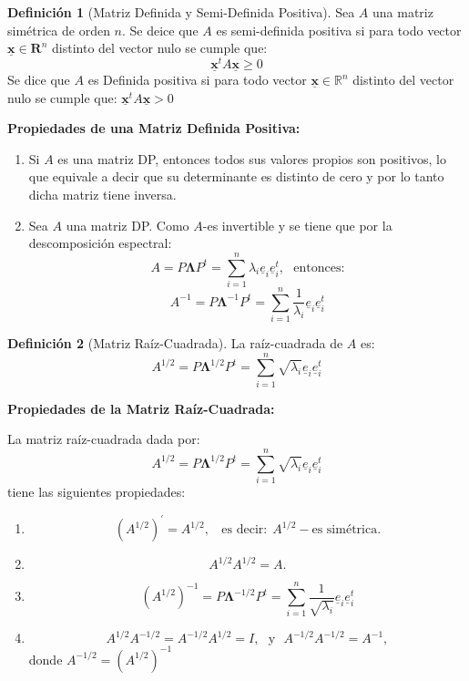 \documentclass[
]{book}
\theoremstyle{definition}
\newtheorem{definition}{Definición}[chapter]
\theoremstyle{definition}
\theoremstyle{definition}
\theoremstyle{definition}
\theoremstyle{remark}
\begin{document}
\begin{definition}[Matriz Definida y Semi-Definida Positiva]
\protect\hypertarget{def:matriz-def-pos}{}\label{def:matriz-def-pos}Sea \(A\) una matriz simétrica de orden \(n\). Se deice que \(A\) es semi-definida positiva si para todo vector \(\underline{\mathbf{x}}\in \mathbf{R}^n\) distinto del vector nulo se cumple que:
\[
                  \underline{\mathbf{x}}^t A \underline{\mathbf{x}} \geq 0
\]
Se dice que \(A\) es Definida positiva si para todo vector \(\underline{\mathbf{x}}\in \mathbb{R}^n\) distinto del vector nulo se cumple que: \(\underline{\mathbf{x}}^t A\underline{\mathbf{x}} > 0\)
\end{definition}

\textbf{Propiedades de una Matriz Definida Positiva:}

\begin{enumerate}
\def\labelenumi{\alph{enumi}.}
\item
  Si \(A\) es una matriz DP, entonces todos sus valores propios son positivos, lo que equivale a decir que su determinante es distinto de cero y por lo tanto dicha matriz tiene inversa.
\item
  Sea \(A\) una matriz DP. Como \(A\)-es invertible y se tiene que por la descomposición espectral:
  \[
                 A=P\mathbf{\Lambda} P^t=\sum_{i=1}^{n}\lambda_i\underline{e}_i\underline{e}_i^t,\ \ \ \text{entonces:}
  \]
  \[
  A^{-1}=P \mathbf{\Lambda}^{-1}P^t=\sum_{i=1}^{n}\frac{1}{\lambda_i}\underline{e}_i\underline{e}_i^t
  \]
\end{enumerate}

\begin{definition}[Matriz Raíz-Cuadrada]
\protect\hypertarget{def:matriz-raiz-cuadrada}{}\label{def:matriz-raiz-cuadrada}La raíz-cuadrada de \(A\) es:
\[
A^{1/2}=P \mathbf{\mathbf{\mathbf{\mathbf{\mathbf{\Lambda}}}}}^{1/2}P^t=\sum_{i=1}^{n}\sqrt{\lambda_i}\underline{e}_i\underline{e}_i^t
\]
\end{definition}

\textbf{Propiedades de la Matriz Raíz-Cuadrada:}

La matriz raíz-cuadrada dada por:
\[
A^{1/2}=P \mathbf{\mathbf{\mathbf{\mathbf{\mathbf{\Lambda}}}}}^{1/2}P^t=\sum_{i=1}^{n}\sqrt{\lambda_i}\underline{e}_i\underline{e}_i^t
\]
tiene las siguientes propiedades:

\begin{enumerate}
\def\labelenumi{\alph{enumi}.}
\item
  \[
  (A^{1/2})^{'}=A^{1/2}, \ \ \ \ \text{es decir:} \ \ A^{1/2}-\text{es simétrica.}
  \]
\item
  \[
  A^{1/2}A^{1/2}=A.
  \]
\item
  \[
  (A^{1/2})^{-1}=P\mathbf{\mathbf{\mathbf{\mathbf{\mathbf{\Lambda}}}}}^{-1/2}P^t=\sum_{i=1}^{n}\frac{1}{\sqrt{\lambda_i}}\underline{e}_i\underline{e}_i^t
  \]
\item
  \[
  A^{1/2}A^{-1/2}=A^{-1/2}A^{1/2}=I,\ \ \ \text{y} \ \ \ A^{-1/2}A^{-1/2}=A^{-1},
  \]
  donde \(A^{-1/2}=(A^{1/2})^{-1}\)
\end{enumerate}
\end{document}
